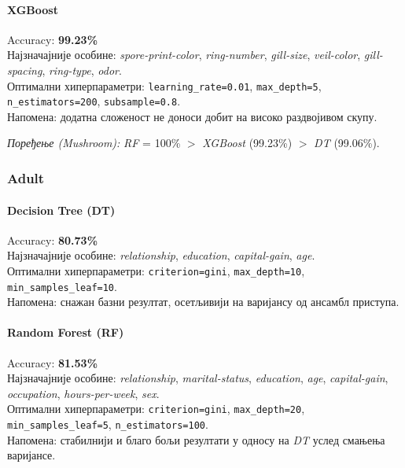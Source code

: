 \paragraph{XGBoost}
Accuracy: \textbf{99.23\%}\\
Најзначајније особине: \textit{spore-print-color}, \textit{ring-number}, \textit{gill-size}, \textit{veil-color}, \textit{gill-spacing}, \textit{ring-type}, \textit{odor}.\\
Оптимални хиперпараметри: \texttt{learning\_rate=0.01}, \texttt{max\_depth=5}, \texttt{n\_estimators=200}, \texttt{subsample=0.8}.\\
Напомена: додатна сложеност не доноси добит на високо раздвојивом скупу.

\medskip
\noindent\textit{Поређење (Mushroom):} \textit{RF} = 100\% $>$ \textit{XGBoost} (99.23\%) $>$ \textit{DT} (99.06\%).

\subsubsection{Adult}

\paragraph{Decision Tree (DT)}
Accuracy: \textbf{80.73\%}\\
Најзначајније особине: \textit{relationship}, \textit{education}, \textit{capital-gain}, \textit{age}.\\
Оптимални хиперпараметри: \texttt{criterion=gini}, \texttt{max\_depth=10}, \texttt{min\_samples\_leaf=10}.\\
Напомена: снажан базни резултат, осетљивији на варијансу од ансамбл приступа.

\paragraph{Random Forest (RF)}
Accuracy: \textbf{81.53\%}\\
Најзначајније особине: \textit{relationship}, \textit{marital-status}, \textit{education}, \textit{age}, \textit{capital-gain}, \textit{occupation}, \textit{hours-per-week}, \textit{sex}.\\
Оптимални хиперпараметри: \texttt{criterion=gini}, \texttt{max\_depth=20}, \texttt{min\_samples\_leaf=5}, \texttt{n\_estimators=100}.\\
Напомена: стабилнији и благо бољи резултати у односу на \textit{DT} услед смањења варијансе.


